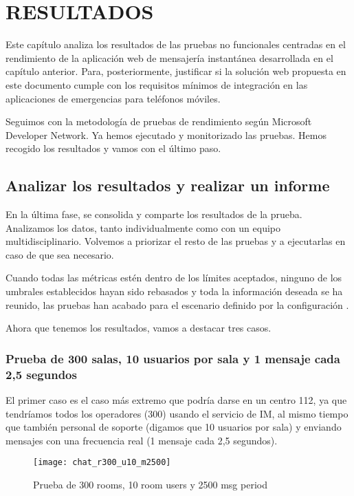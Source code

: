 \chapter{RESULTADOS\label{sec:resultados}}

\clearpage

Este capítulo analiza los resultados de las pruebas no funcionales centradas en el rendimiento de la aplicación web de mensajería instantánea desarrollada en el capítulo anterior. Para, posteriormente, justificar si la solución web propuesta en este documento cumple con los requisitos mínimos de integración en las aplicaciones de emergencias para teléfonos móviles.

Seguimos con la metodología de pruebas de rendimiento según Microsoft Developer Network. Ya hemos ejecutado y monitorizado las pruebas. Hemos recogido los resultados y vamos con el último paso.

\section{Analizar los resultados y realizar un informe}

En la última fase, se consolida y comparte los resultados de la prueba. Analizamos los datos, tanto individualmente como con un equipo multidisciplinario. Volvemos a priorizar el resto de las pruebas y a ejecutarlas en caso de que sea necesario.

Cuando todas las métricas estén dentro de los límites aceptados, ninguno de los umbrales establecidos hayan sido rebasados y toda la información deseada se ha reunido, las pruebas han acabado para el escenario definido por la configuración \cite{jmeter6}.

Ahora que tenemos los resultados, vamos a destacar tres casos.

\subsection{Prueba de 300 salas, 10 usuarios por sala y 1 mensaje cada 2,5 segundos}

El primer caso es el caso más extremo que podría darse en un centro 112, ya que tendríamos todos los operadores (300) usando el servicio de IM, al mismo tiempo que también personal de soporte (digamos que 10 usuarios por sala) y enviando mensajes con una frecuencia real (1 mensaje cada 2,5 segundos).

\begin{figure}[htp!]
  \centering
  \texttt{[image: chat\_r300\_u10\_m2500]}
  \caption{Prueba de 300 rooms, 10 room users y 2500 msg period}
  \label{fig:chat_r300_u10_m2500}
\end{figure}

